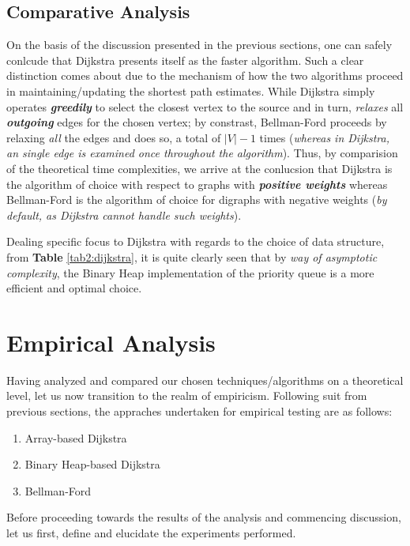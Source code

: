 \documentclass[a4paper, 12pt]{report}
\theoremstyle{definition}
\begin{document}
\section{Comparative Analysis}
On the basis of the discussion presented in the previous sections, one can safely conlcude that Dijkstra presents itself as the faster algorithm. Such a clear distinction comes about
due to the mechanism of how the two algorithms proceed in maintaining/updating the shortest path estimates. While Dijkstra simply operates \emph{\textbf{greedily}} to select the closest vertex
to the source and in turn, \emph{relaxes} all \emph{\textbf{outgoing}} edges for the chosen vertex; by constrast, Bellman-Ford proceeds by relaxing \emph{all} the edges and does so, a total of \(|V| - 1\)
times (\emph{whereas in Dijkstra, an single edge is examined once throughout the algorithm}). Thus, by comparision of the theoretical time complexities, we arrive at the conlucsion that Dijkstra is the 
algorithm of choice with respect to graphs with \emph{\textbf{positive weights}} whereas Bellman-Ford is the algorithm of choice for digraphs with negative weights (\emph{by default, as Dijkstra cannot handle such weights}).

Dealing specific focus to Dijkstra with regards to the choice of data structure, from \textbf{Table} \ref{tab2:dijkstra}, it is quite clearly seen that by \emph{way of asymptotic complexity}, the Binary Heap implementation of the
priority queue is a more efficient and optimal choice.

\chapter{Empirical Analysis}
Having analyzed and compared our chosen techniques/algorithms on a theoretical level, let us now transition to the realm of empiricism. Following suit from previous sections, the appraches undertaken for empirical testing are as follows:
\begin{enumerate}
  \item Array-based Dijkstra
  \item Binary Heap-based Dijkstra
  \item Bellman-Ford
\end{enumerate}
Before proceeding towards the results of the analysis and commencing discussion, let us first, define and elucidate the experiments performed.
\end{document}
